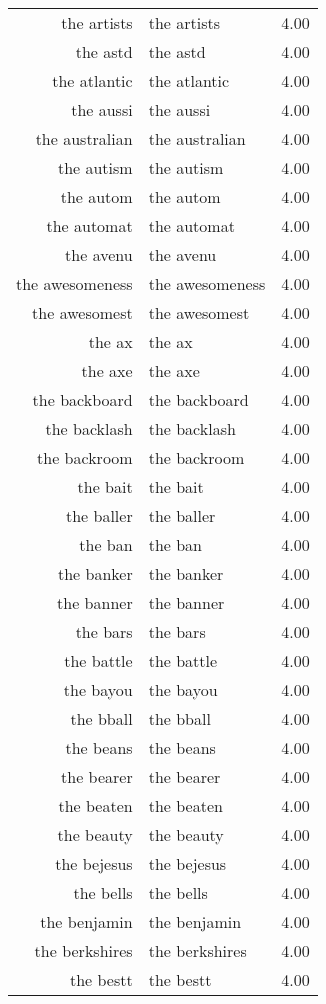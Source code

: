 \begin{table}[ht]
\begin{tabular}{rlr}
  the artists & the artists & 4.00 \\ 
  the astd & the astd & 4.00 \\ 
  the atlantic & the atlantic & 4.00 \\ 
  the aussi & the aussi & 4.00 \\ 
  the australian & the australian & 4.00 \\ 
  the autism & the autism & 4.00 \\ 
  the autom & the autom & 4.00 \\ 
  the automat & the automat & 4.00 \\ 
  the avenu & the avenu & 4.00 \\ 
  the awesomeness & the awesomeness & 4.00 \\ 
  the awesomest & the awesomest & 4.00 \\ 
  the ax & the ax & 4.00 \\ 
  the axe & the axe & 4.00 \\ 
  the backboard & the backboard & 4.00 \\ 
  the backlash & the backlash & 4.00 \\ 
  the backroom & the backroom & 4.00 \\ 
  the bait & the bait & 4.00 \\ 
  the baller & the baller & 4.00 \\ 
  the ban & the ban & 4.00 \\ 
  the banker & the banker & 4.00 \\ 
  the banner & the banner & 4.00 \\ 
  the bars & the bars & 4.00 \\ 
  the battle & the battle & 4.00 \\ 
  the bayou & the bayou & 4.00 \\ 
  the bball & the bball & 4.00 \\ 
  the beans & the beans & 4.00 \\ 
  the bearer & the bearer & 4.00 \\ 
  the beaten & the beaten & 4.00 \\ 
  the beauty & the beauty & 4.00 \\ 
  the bejesus & the bejesus & 4.00 \\ 
  the bells & the bells & 4.00 \\ 
  the benjamin & the benjamin & 4.00 \\ 
  the berkshires & the berkshires & 4.00 \\ 
  the bestt & the bestt & 4.00 \\ 

\end{tabular}
\end{table}
